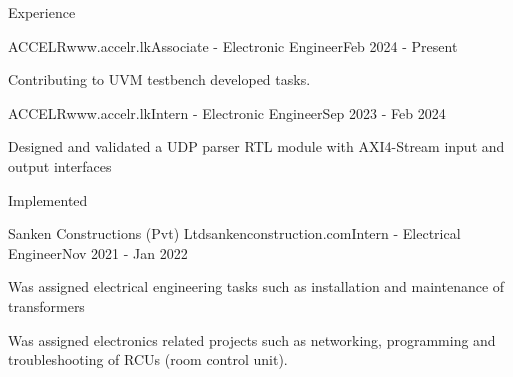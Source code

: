 \documentclass[
	11pt, %
]{./../assets/resume} %
\begin{document}

\begin{rSection}{Experience}

	\begin{rSubsectionX}{ACCELR}{www.accelr.lk}{Associate - Electronic Engineer}{Feb 2024 - Present}
		\item Contributing to UVM testbench developed tasks.
	\end{rSubsectionX}

	\begin{rSubsectionX}{ACCELR}{www.accelr.lk}{Intern - Electronic Engineer}{Sep 2023 - Feb 2024}
		\item Designed and validated a UDP parser RTL module with AXI4-Stream input and output interfaces
		\item Implemented 
	\end{rSubsectionX}

	\begin{rSubsectionX}{Sanken Constructions (Pvt) Ltd}{sankenconstruction.com}{Intern - Electrical Engineer}{Nov 2021 - Jan 2022}
		\item Was assigned electrical engineering tasks such as installation and maintenance of transformers
		\item Was assigned electronics related projects such as networking, programming and troubleshooting of RCUs (room control unit).
	\end{rSubsectionX}

\end{rSection}

\end{document}
